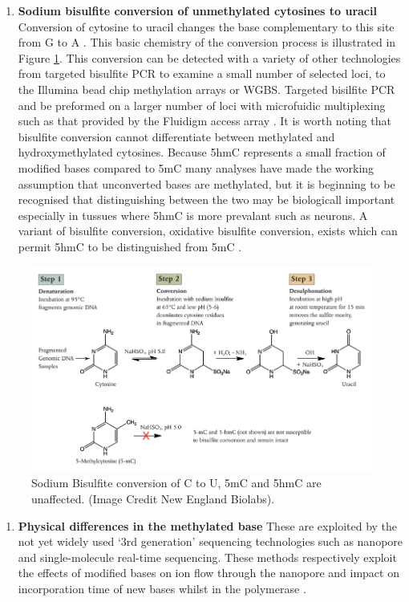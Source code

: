 \documentclass[]{book}
\providecommand{\tightlist}{%
  \setlength{\itemsep}{0pt}\setlength{\parskip}{0pt}}
\begin{document}
\begin{enumerate}
\item
  \textbf{Sodium bisulfite conversion of unmethylated cytosines to uracil}
  Conversion of cytosine to uracil changes the base complementary to this site from G to A \citep{Hayatsu1970}. This basic chemistry of the conversion process is illustrated in Figure \ref{fig:BisulfiteConversionNEB}. This conversion can be detected with a variety of other technologies from targeted bisulfite PCR to examine a small number of selected loci, to the Illumina bead chip methylation arrays or WGBS. Targeted bisilfite PCR and be preformed on a larger number of loci with microfuidic multiplexing such as that provided by the Fluidigm access array \citep{Adamowicz2018}. It is worth noting that bisulfite conversion cannot differentiate between methylated and hydroxymethylated cytosines. Because 5hmC represents a small fraction of modified bases compared to 5mC many analyses have made the working assumption that unconverted bases are methylated, but it is beginning to be recognised that distinguishing between the two may be biologicall important especially in tussues where 5hmC is more prevalant such as neurons. A variant of bisulfite conversion, oxidative bisulfite conversion, exists which can permit 5hmC to be distinguished from 5mC \citep{Skvortsova2017}.
\end{enumerate}

\begin{figure}

{\centering \includegraphics[width=0.8\linewidth]{figs/BisulfiteConversionNEB} 

}

\caption{Sodium Bisulfite conversion of C to U, 5mC and 5hmC are unaffected. (Image Credit New England Biolabs).}\label{fig:BisulfiteConversionNEB}
\end{figure}



\begin{enumerate}
\def\labelenumi{\arabic{enumi}.}
\setcounter{enumi}{3}
\tightlist
\item
  \textbf{Physical differences in the methylated base}
  These are exploited by the not yet widely used `3rd generation' sequencing technologies such as nanopore and single-molecule real-time sequencing. These methods respectively exploit the effects of modified bases on ion flow through the nanopore and impact on incorporation time of new bases whilst in the polymerase \citep[\citet{Simpson2017}]{Rhoads2015}.
\end{enumerate}
\end{document}
